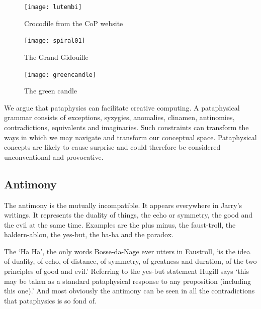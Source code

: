 \begin{figure}[htb]
  \centering
  \begin{minipage}{.275\linewidth}
    \texttt{[image: lutembi]}
  \caption[Crocodile]{Crocodile from the CoP website}
\label{img1}
  \end{minipage}
  \hspace{.05\linewidth}
  \begin{minipage}{.275\linewidth}
    \texttt{[image: spiral01]}
  \caption[Gidouille]{\raggedleft The Grand Gidouille}
\label{img2}
  \end{minipage}
  \hspace{.05\linewidth}
  \begin{minipage}{.275\linewidth}
    \texttt{[image: greencandle]}
  \caption[Green Candle]{The green candle}
\label{img3}
  \end{minipage}
\end{figure}

\begin{draft}
  We argue that pataphysics can facilitate creative computing. A pataphysical grammar consists of exceptions, syzygies, anomalies, clinamen, antinomies, contradictions, equivalents and imaginaries. Such constraints can transform the ways in which we may navigate and transform our conceptual space. Pataphysical concepts are likely to cause surprise and could therefore be considered unconventional and provocative.
\end{draft}


\subsection{Antimony}

The antimony is the mutually incompatible. It appears everywhere in Jarry's writings. It represents the duality of things, the echo or symmetry, the good and the evil at the same time. Examples are the plus minus, the faust-troll, the haldern-ablou, the yes-but, the ha-ha and the paradox.

The `Ha Ha', the only words Bosse-da-Nage ever utters in Faustroll, `is the idea of duality, of echo, of distance, of symmetry, of greatness and duration, of the two principles of good and evil.' \autocite{Hugill2012a} Referring to the yes-but statement Hugill says `this may be taken as a standard pataphysical response to any proposition (including this one).' And most obviously the antimony can be seen in all the contradictions that pataphysics is so fond of.

